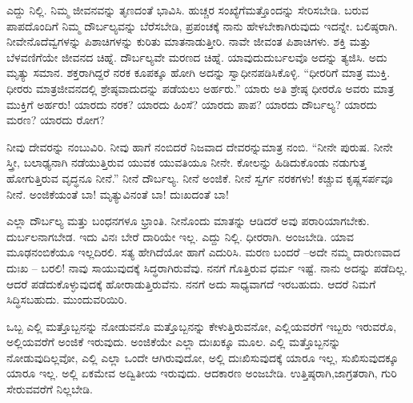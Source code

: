 ಎದ್ದು ನಿಲ್ಲಿ. ನಿಮ್ಮ ಜೀವನವನ್ನು ತೃಣದಂತೆ ಭಾವಿಸಿ. ಹುಚ್ಚರ ಸಂಖ್ಯೆಗೆ\break ಮತ್ತೊಂದನ್ನು ಸೇರಿಸಬೇಡಿ. ಬರುವ ಪಾಪದೊಂದಿಗೆ ನಿಮ್ಮ ದೌರ್ಬಲ್ಯವನ್ನು ಬೆರೆಸ\-ಬೇಡಿ, ಪ್ರಪಂಚಕ್ಕೆ ನಾನು ಹೇಳಬೇಕಾಗಿರುವುದು ಇದನ್ನೇ. ಬಲಿಷ್ಠರಾಗಿ. ನೀವೇನೊ\break ದೆವ್ವಗಳನ್ನು ಪಿಶಾಚಿಗಳನ್ನು ಕುರಿತು ಮಾತನಾಡುತ್ತೀರಿ. ನಾವೇ ಜೀವಂತ ಪಿಶಾಚಿಗಳು. ಶಕ್ತಿ ಮತ್ತು ಬೆಳವಣಿಗೆಯೇ ಜೀವನದ ಚಿಹ್ನೆ. ದೌರ್ಬಲ್ಯವೇ ಮರಣದ ಚಿಹ್ನೆ. ಯಾವುದು\break ದುರ್ಬಲವೊ ಅದನ್ನು ತ್ಯಜಿಸಿ. ಅದು ಮೃತ್ಯು ಸಮಾನ. ಶಕ್ತರಾಗಿದ್ದರೆ ನರಕ ಕೂಪಕ್ಕೂ ಹೋಗಿ ಅದನ್ನು ಸ್ವಾಧೀನಪಡಿಸಿಕೊಳ್ಳಿ. “ಧೀರರಿಗೆ ಮಾತ್ರ ಮುಕ್ತಿ. ಧೀರರು ಮಾತ್ರ\break ಜೀವನದಲ್ಲಿ ಶ್ರೇಷ್ಠವಾದುದನ್ನು ಪಡೆಯಲು ಅರ್ಹರು.” ಯಾರು ಅತಿ ಶ್ರೇಷ್ಠ ಧೀರರೊ ಅವರು ಮಾತ್ರ ಮುಕ್ತಿಗೆ ಅರ್ಹರು! ಯಾರದು ನರಕ? ಯಾರದು ಹಿಂಸೆ? ಯಾರದು ಪಾಪ? ಯಾರದು ದೌರ್ಬಲ್ಯ? ಯಾರದು ಮರಣ? ಯಾರದು ರೋಗ?

ನೀವು ದೇವರನ್ನು ನಂಬುವಿರಿ. ನೀವು ಹಾಗೆ ನಂಬಿದರೆ ನಿಜವಾದ ದೇವರನ್ನು\break ಮಾತ್ರ ನಂಬಿ. “ನೀನೇ ಪುರುಷ. ನೀನೇ ಸ್ತ್ರೀ, ಬಲಾಢ್ಯನಾಗಿ ನಡೆಯುತ್ತಿರುವ ಯುವಕ ಯುವತಿಯೂ ನೀನೇ. ಕೋಲನ್ನು ಹಿಡಿದುಕೊಂಡು ನಡುಗುತ್ತ ಹೋಗುತ್ತಿರುವ ವೃದ್ಧನೂ ನೀನೆ.” ನೀನೆ ದೌರ್ಬಲ್ಯ. ನೀನೆ ಅಂಜಿಕೆ. ನೀನೆ ಸ್ವರ್ಗ ನರಕಗಳು! ಕಚ್ಚುವ ಕೃಷ್ಣಸರ್ಪವೂ ನೀನೆ. ಅಂಜಿಕೆಯಂತೆ ಬಾ! ಮೃತ್ಯುವಿನಂತೆ ಬಾ! ದುಃಖದಂತೆ ಬಾ!

ಎಲ್ಲಾ ದೌರ್ಬಲ್ಯ ಮತ್ತು ಬಂಧನಗಳೂ ಭ್ರಾಂತಿ. ನೀನೊಂದು ಮಾತನ್ನು ಆಡಿದರೆ ಅವು ಪರಾರಿಯಾಗಬೇಕು. ದುರ್ಬಲನಾಗಬೇಡ. ಇದು ವಿನಃ ಬೇರೆ ದಾರಿಯೇ ಇಲ್ಲ. ಎದ್ದು ನಿಲ್ಲಿ. ಧೀರರಾಗಿ. ಅಂಜಬೇಡಿ. ಯಾವ ಮೂಢನಂಬಿಕೆಯೂ ಇಲ್ಲದಿರಲಿ. ಸತ್ಯ ಹೇಗಿದೆಯೋ ಹಾಗೆ ಎದುರಿಸಿ. ಮರಣ ಬಂದರೆ –ಅದೇ ನಮ್ಮ ದಾರುಣವಾದ ದುಃಖ – ಬರಲಿ! ನಾವು ಸಾಯುವುದಕ್ಕೆ ಸಿದ್ಧರಾಗಿರುವೆವು. ನನಗೆ ಗೊತ್ತಿರುವ ಧರ್ಮ ಇಷ್ಟೆ. ನಾನು ಅದನ್ನು ಪಡೆದಿಲ್ಲ. ಆದರೆ ಪಡೆದುಕೊಳ್ಳುವುದಕ್ಕೆ ಹೋರಾಡುತ್ತಿರುವೆನು. ನನಗೆ ಅದು ಸಾಧ್ಯವಾಗದೆ ಇರಬಹುದು. ಆದರೆ ನಿಮಗೆ ಸಿದ್ಧಿಸಬಹುದು. ಮುಂದುವರಿಯಿರಿ.

ಒಬ್ಬ ಎಲ್ಲಿ ಮತ್ತೊಬ್ಬನನ್ನು ನೋಡುವನೊ ಮತ್ತೊಬ್ಬನನ್ನು ಕೇಳುತ್ತಿರುವನೋ, ಎಲ್ಲಿಯವರೆಗೆ ಇಬ್ಬರು ಇರುವರೊ, ಅಲ್ಲಿಯವರೆಗೆ ಅಂಜಿಕೆ ಇರುವುದು. ಅಂಜಿಕೆಯೇ ಎಲ್ಲಾ ದುಃಖಕ್ಕೂ ಮೂಲ. ಎಲ್ಲಿ ಮತ್ತೊಬ್ಬನನ್ನು ನೋಡುವುದಿಲ್ಲವೋ, ಎಲ್ಲಿ ಎಲ್ಲಾ ಒಂದೇ ಆಗಿರುವುದೋ, ಅಲ್ಲಿ ದುಃಖಿಸುವುದಕ್ಕೆ ಯಾರೂ ಇಲ್ಲ, ಸುಖಿಸುವುದಕ್ಕೂ ಯಾರೂ ಇಲ್ಲ. ಅಲ್ಲಿ ಏಕಮೇವ ಅದ್ವಿತೀಯ ಇರುವುದು. ಆದಕಾರಣ ಅಂಜಬೇಡಿ. ಉತ್ತಿಷ್ಠರಾಗಿ,\break ಜಾಗ್ರತರಾಗಿ, ಗುರಿ ಸೇರುವವರೆಗೆ ನಿಲ್ಲಬೇಡಿ.

